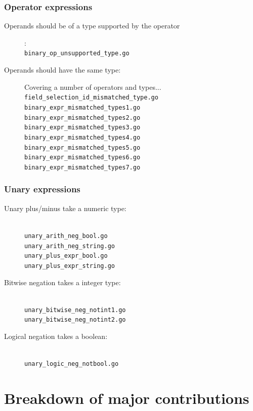 \documentclass[oneside]{article}
\begin{document}
\subsubsection{Operator expressions}
\begin{description}
  \item[Operands should be of a type supported by the operator]: \\
    \verb|binary_op_unsupported_type.go|
  \item[Operands should have the same type:] Covering a number of operators and types...\\
    \verb|field_selection_id_mismatched_type.go|\\
    \verb|binary_expr_mismatched_types1.go|\\
    \verb|binary_expr_mismatched_types2.go|\\
    \verb|binary_expr_mismatched_types3.go|\\
    \verb|binary_expr_mismatched_types4.go|\\
    \verb|binary_expr_mismatched_types5.go|\\
    \verb|binary_expr_mismatched_types6.go|\\
    \verb|binary_expr_mismatched_types7.go|
\end{description}


\subsubsection{Unary expressions}
\begin{description}
  \item[Unary plus/minus take a numeric type:] \ \\
    \verb|unary_arith_neg_bool.go|\\
    \verb|unary_arith_neg_string.go|\\
    \verb|unary_plus_expr_bool.go|\\
    \verb|unary_plus_expr_string.go|
  \item[Bitwise negation takes a integer type:] \ \\
    \verb|unary_bitwise_neg_notint1.go|\\
    \verb|unary_bitwise_neg_notint2.go|
  \item[Logical negation takes a boolean:] \ \\
    \verb|unary_logic_neg_notbool.go|
\end{description}

\section{Breakdown of major contributions}
\end{document}
